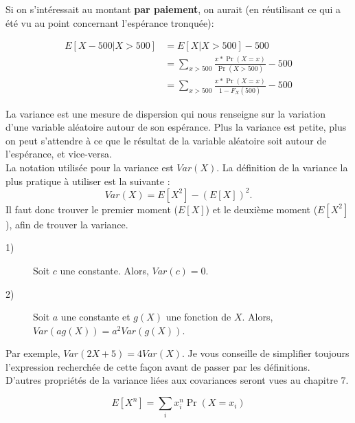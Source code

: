 \documentclass[10pt, french]{article}
\begin{document}
\begin{multicols*}{2}
\begin{definitionNOHFILLprop}
 Si on s'intéressait au montant \textbf{par paiement}, on aurait (en réutilisant ce qui a été vu au point concernant l'espérance tronquée): 
 
 \begin{align*}
  E[X-500|X>500] &= E[X|X>500] - 500
  \\&= \sum_{x > 500} \frac{x*\Pr(X = x)}{\Pr(X>500)} - 500
  \\&= \sum_{x > 500} \frac{x*\Pr(X = x)}{1 - F_X(500)} - 500
  \end{align*}
 
\end{definitionNOHFILLprop}


\begin{definitionNOHFILL}[Variance]

La variance est une mesure de dispersion qui nous renseigne sur la variation d'une variable aléatoire autour de son espérance. Plus la variance est petite, plus on peut s'attendre à ce que le résultat de la variable aléatoire soit autour de l'espérance, et vice-versa.\\

La notation utilisée pour la variance est $Var(X)$. La définition de la variance la plus pratique à utiliser est la suivante :
$$ Var(X) = E[X^2] - (E[X])^2.$$
Il faut donc trouver le premier moment ($E[X]$) et le deuxième moment ($E[X^2]$), afin de trouver la variance.

\begin{definitionNOHFILLprop}
\begin{description}
  \item[1)] Soit $c$ une constante. Alors, $Var(c) = 0$.
  \item[2)] Soit $a$ une constante et $g(X)$ une fonction de $X$. Alors, $Var(ag(X)) = a^2 Var(g(X))$.
\end{description}

Par exemple, $Var(2X + 5) = 4Var(X) $. Je vous conseille de simplifier toujours l'expression recherchée de cette façon avant de passer par les définitions.\\

D'autres propriétés de la variance liées aux covariances seront vues au chapitre 7.
\end{definitionNOHFILLprop}
\end{definitionNOHFILL}


\begin{definitionNOHFILLprop}
$$E[X^n] = \sum_i x_i^n \Pr(X = x_i)$$
\end{definitionNOHFILLprop}


\end{multicols*}
\end{document}
